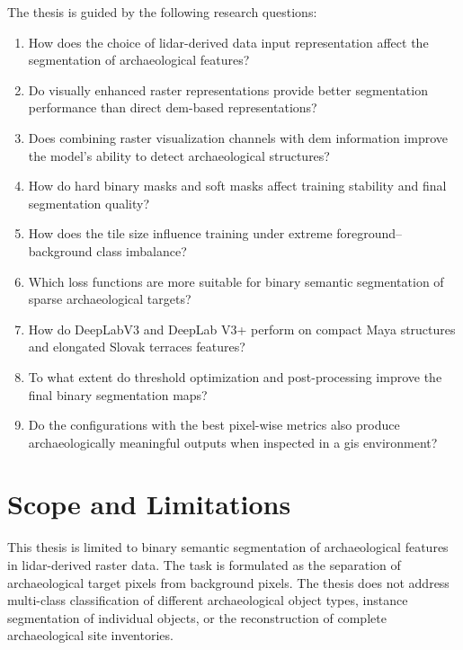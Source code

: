The thesis is guided by the following research questions:
\begin{enumerate}
    \item How does the choice of \gls{lidar}-derived data input representation affect the segmentation of archaeological features?

    \item Do visually enhanced raster representations provide better segmentation performance than direct \gls{dem}-based representations?

    \item Does combining raster visualization channels with \gls{dem} information improve the model's ability to detect archaeological structures?

    \item How do hard binary masks and soft masks affect training stability and final segmentation quality?

    \item How does the tile size influence training under extreme foreground--background class imbalance?

    \item Which loss functions are more suitable for binary semantic segmentation of sparse archaeological targets?

    \item How do DeepLabV3 and DeepLab V3+ perform on compact Maya structures and elongated Slovak terraces features?

    \item To what extent do threshold optimization and post-processing improve the final binary segmentation maps?

    \item Do the configurations with the best pixel-wise metrics also produce archaeologically meaningful outputs when inspected in a \gls{gis} environment?
\end{enumerate}

\section{Scope and Limitations}

This thesis is limited to binary semantic segmentation of archaeological features in \gls{lidar}-derived raster data. The task is formulated as the separation of archaeological target pixels from background pixels. The thesis does not address multi-class classification of different archaeological object types, instance segmentation of individual objects, or the reconstruction of complete archaeological site inventories.

